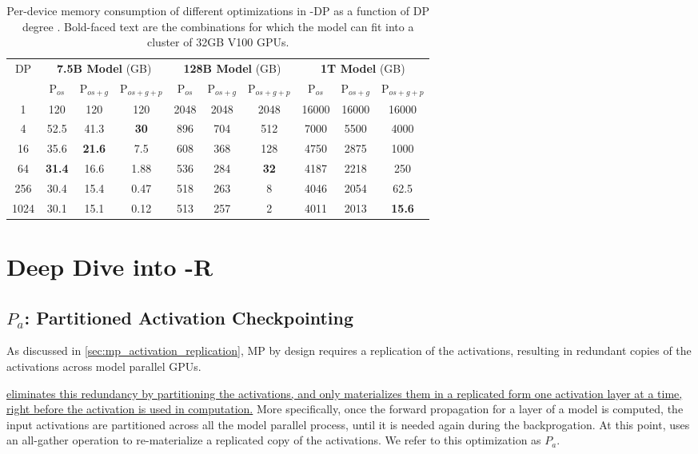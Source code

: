 \begin{table*}
  \centering
  \begin{tabular}{|c||c|c|c||c|c|c||c|c|c|}
  \hline
  \multicolumn{1}{|c}{\multirow{2}{*}{DP}}&\multicolumn{3}{||c}{\textbf{7.5B Model} (GB)} &\multicolumn{3}{||c}{\textbf{128B Model} (GB)} & \multicolumn{3}{||c|}{\textbf {1T Model} (GB)} \\
  \hhline{~---------}
  &P$_{os}$&P$_{os+g}$&P$_{os+g+p}$&P$_{os}$&P$_{os+g}$&P$_{os+g+p}$&P$_{os}$&P$_{os+g}$&P$_{os+g+p}$\\
  \hline
  1&120&120&120&2048&2048&2048&16000&16000&16000\\
  4&52.5&41.3&\textbf{30}&896&704&512&7000&5500&4000\\
  16&35.6&\textbf{21.6}&7.5&608&368&128&4750&2875&1000\\
  64&\textbf{31.4}&16.6&1.88&536&284&\textbf{32}&4187&2218&250\\
  256&30.4&15.4&0.47&518&263&8&4046&2054&62.5\\
  1024&30.1&15.1&0.12&513&257&2&4011&2013&\textbf{15.6}\\
  \hline
  \end{tabular}
\caption{Per-device memory consumption of different optimizations in \name-DP as a function of DP degree . Bold-faced text are the combinations for which the model can fit into a cluster of 32GB V100 GPUs.}
\label{tab:memory-consumption}
\end{table*}

\section{Deep Dive into \name-R}

\subsection{$P_a$: Partitioned Activation Checkpointing}
\label{sec:p_a}

As discussed in \ref{sec:mp_activation_replication}, MP by design requires a replication of the activations, resulting in redundant copies of the activations across model parallel GPUs.

\uline{\name eliminates this redundancy by partitioning the activations, and only materializes them in a replicated form one activation layer at a time, right before the activation is used in computation.}
More specifically, once the forward propagation for a layer of a model is computed, the input activations are partitioned across all the model parallel process, until it is needed again during the backprogation. At this point, \name uses an all-gather operation to re-materialize a replicated copy of the activations. We refer to this optimization as \uline{$P_a$}.

